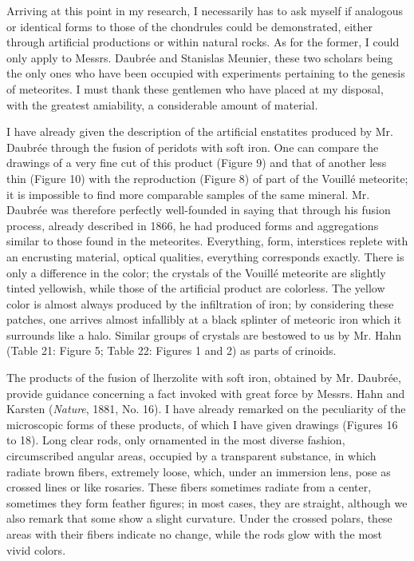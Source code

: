 \documentclass[a4paper, 12pt, oneside]{article}
\begin{document}
Arriving at this point in my research, I necessarily has to ask myself if analogous or identical forms to those of the chondrules could be demonstrated, either through artificial productions or within natural rocks. As for the former, I could only apply to Messrs. Daubrée and Stanislas Meunier, these two scholars being the only ones who have been occupied with experiments pertaining to the genesis of meteorites. I must thank these gentlemen who have placed at my disposal, with the greatest amiability, a considerable amount of material.

I have already given the description of the artificial enstatites produced by Mr. Daubrée through the fusion of peridots with soft iron. One can compare the drawings of a very fine cut of this product (Figure 9) and that of another less thin (Figure 10) with the reproduction (Figure 8) of part of the Vouillé meteorite; it is impossible to find more comparable samples of the same mineral. Mr. Daubrée was therefore perfectly well-founded in saying that through his fusion process, already described in 1866, he had produced forms and aggregations similar to those found in the meteorites. Everything, form, interstices replete with an encrusting material, optical qualities, everything corresponds exactly. There is only a difference in the color; the crystals of the Vouillé meteorite are slightly tinted yellowish, while those of the artificial product are colorless. The yellow color is almost always produced by the infiltration of iron; by considering these patches, one arrives almost infallibly at a black splinter of meteoric iron which it surrounds like a halo. Similar groups of crystals are bestowed to us by Mr. Hahn (Table 21: Figure 5; Table 22: Figures 1 and 2) as parts of crinoids.

The products of the fusion of lherzolite with soft iron, obtained by Mr. Daubrée, provide guidance concerning a fact invoked with great force by Messrs. Hahn and Karsten (\emph{Nature}, 1881, No. 16). I have already remarked on the peculiarity of the microscopic forms of these products, of which I have given drawings (Figures 16 to 18). Long clear rods, only ornamented in the most diverse fashion, circumscribed angular areas, occupied by a transparent substance, in which radiate brown fibers, extremely loose, which, under an immersion lens, pose as crossed lines or like rosaries. These fibers sometimes radiate from a center, sometimes they form feather figures; in most cases, they are straight, although we also remark that some show a slight curvature. Under the crossed polars, these areas with their fibers indicate no change, while the rods glow with the most vivid colors.
\end{document}
